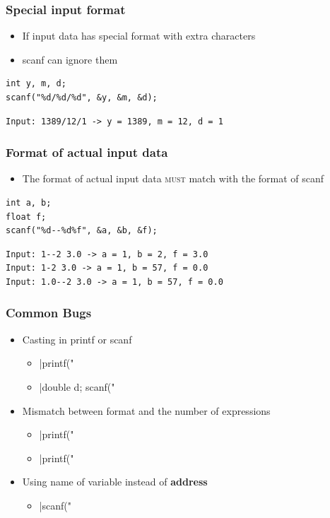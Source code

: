 \documentclass{../c-lecture}
\begin{document}
\begin{frame}[fragile]
  \frametitle{Special input format}
  \begin{itemize}
    \item If input data has special format with extra characters
    \item scanf can ignore them
  \end{itemize}
  \begin{verbatim}
int y, m, d;
scanf("%d/%d/%d", &y, &m, &d);
  \end{verbatim}
  \begin{verbatim}
Input: 1389/12/1 -> y = 1389, m = 12, d = 1
  \end{verbatim}
\end{frame}

\begin{frame}[fragile]
  \frametitle{Format of actual input data}
  \begin{itemize}
    \item
      The format of actual input data \textsc{\color{YellowOrange} must} match
      with the format of scanf

  \end{itemize}
  \begin{verbatim}
int a, b;
float f;
scanf("%d--%d%f", &a, &b, &f);
  \end{verbatim}
  \begin{verbatim}
Input: 1--2 3.0 -> a = 1, b = 2, f = 3.0
Input: 1-2 3.0 -> a = 1, b = 57, f = 0.0
Input: 1.0--2 3.0 -> a = 1, b = 57, f = 0.0
  \end{verbatim}
\end{frame}

\begin{frame}[fragile]
  \frametitle{Common Bugs}
  \begin{itemize}
    \item Casting in printf or scanf
    \begin{itemize}
      \item {}|printf("%
      \item {}|double d; scanf("%
    \end{itemize}
    \item Mismatch between format and the number of expressions
    \begin{itemize}
      \item {}|printf("%
      \item {}|printf("%
    \end{itemize}
    \item
      Using name of variable instead of \textbf{\color{Orange} address}
    \begin{itemize}
      \item {}|scanf("%
    \end{itemize}
  \end{itemize}
\end{frame}
\end{document}
